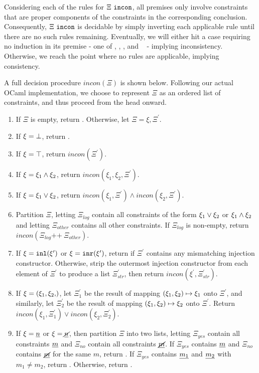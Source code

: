 Considering each of the rules for $\Xi ~\mathtt{incon}$, all premises only involve constraints that are proper components of the constraints in the corresponding conclusion. Consequently, $\Xi ~\mathtt{incon}$ is decidable by simply inverting each applicable rule until there are no such rules remaining. Eventually, we will either hit a case requiring no induction in its premise - one of \CINCFalsity, \CINCNum, \CINCNotNum, and \CINCInj~ - implying inconsistency. Otherwise, we reach the point where no rules are applicable, implying consistency. 

A full decision procedure $incon(\Xi)$ is shown below. Following our actual OCaml implementation, we choose to represent $\Xi$ as an ordered list of constraints, and thus proceed from the head onward.

\begin{enumerate}
\item If $\Xi$ is empty, return . Otherwise, let $\Xi = \xi, \Xi^\prime$.
\item If $\xi = \bot$, return .
\item If $\xi = \top$, return $incon(\Xi^\prime)$.
\item If $\xi = \xi_1 \wedge \xi_2$, return $incon(\xi_1, \xi_2, \Xi^\prime)$.
\item If $\xi = \xi_1 \vee \xi_2$, return $incon(\xi_1, \Xi^\prime) \land incon(\xi_2, \Xi^\prime)$.
\item Partition $\Xi$, letting $\Xi_{log}$ contain all constraints of the form $\xi_1 \vee \xi_2$ or $\xi_1 \wedge \xi_2$ and letting $\Xi_{other}$ contains all other constraints. If $\Xi_{log}$ is non-empty, return $incon(\Xi_{log} \texttt{++}~ \Xi_{other})$.
\item If $\xi = \mathtt{inl}(\xi^\prime)$ or $\xi = \mathtt{inr}(\xi^\prime)$, return  if $\Xi^\prime$ contains any mismatching injection constructor. Otherwise, strip the outermost injection constructor from each element of $\Xi^\prime$ to produce a list $\Xi^\prime_{str}$, then return $incon(\xi^\prime, \Xi^\prime_{str})$.
\item If $\xi = \cpair{\xi_1, \xi_2}$, let $\Xi^\prime_1$ be the result of mapping $(\xi_1 , \xi_2) \mapsto \xi_1$ onto $\Xi^\prime$, and similarly, let $\Xi^\prime_2$ be the result of mapping $(\xi_1 , \xi_2) \mapsto \xi_2$ onto $\Xi^\prime$. Return $incon(\xi_1, \Xi^\prime_1) \lor incon(\xi_2, \Xi^\prime_2)$.
\item If $\xi = \underline{n}$ or $\xi = \underline{\cancel{n}}$, then partition $\Xi$ into two lists, letting $\Xi_{yes}$ contain all constraints $\underline{m}$ and $\Xi_{no}$ contain all constraints $\underline{\cancel{m}}$. If $\Xi_{yes}$ contains $\underline{m}$ and $\Xi_{no}$ contains $\underline{\cancel{m}}$ for the same $m$, return . If $\Xi_{yes}$ contains $\underline{m_1}$ and $\underline{m_2}$ with $m_1 \neq m_2$, return . Otherwise, return .
\end{enumerate}

